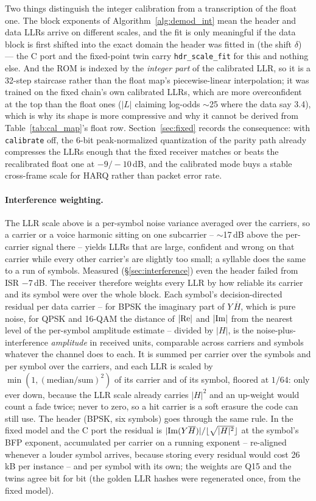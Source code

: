 Two things distinguish the integer calibration from a transcription of
the float one.  The block exponents of Algorithm~\ref{alg:demod_int}
mean the header and data LLRs arrive on different scales, and the fit
is only meaningful if the data block is first shifted into the exact
domain the header was fitted in (the shift $\delta$) --- the C port and the
fixed-point twin carry \texttt{hdr\_scale\_fit} for this and nothing
else.  And the ROM is indexed by the \emph{integer part} of the
calibrated LLR, so it is a 32-step staircase rather than the float
map's piecewise-linear interpolation; it was trained on the fixed
chain's own calibrated LLRs, which are more overconfident at the top
than the float ones ($|L|$ claiming log-odds $\sim$25 where the data
say 3.4), which is why its shape is more compressive and why it cannot
be derived from Table~\ref{tab:cal_map}'s float row.  Section~\ref{sec:fixed}
records the consequence: with \texttt{calibrate} off, the 6-bit
peak-normalized quantization of the parity path already compresses the
LLRs enough that the fixed receiver matches or beats the recalibrated
float one at $-9/-10$\,dB, and the calibrated mode buys a stable
cross-frame scale for HARQ rather than packet error rate.

\paragraph{Interference weighting.}
\label{sec:iweight}
The LLR scale above is a per-symbol noise variance averaged over the
carriers, so a carrier or a voice harmonic sitting on one subcarrier --
$\sim$17\,dB above the per-carrier signal there -- yields LLRs that are
large, confident and wrong on that carrier while every other carrier's
are slightly too small; a syllable does the same to a run of symbols.
Measured (\S\ref{sec:interference}) even the header failed from ISR
$-7$\,dB.  The receiver therefore weights every LLR by how reliable its
carrier and its symbol were over the whole block.  Each symbol's
decision-directed residual per data carrier -- for BPSK the imaginary
part of $Y\,\overline{H}$, which is pure noise, for QPSK and 16-QAM the
distance of $|{\rm Re}|$ and $|{\rm Im}|$ from the nearest level of the
per-symbol amplitude estimate -- divided by $|H|$, is the
noise-plus-interference \emph{amplitude} in received units, comparable
across carriers and symbols whatever the channel does to each.  It is
summed per carrier over the symbols and per symbol over the carriers,
and each LLR is scaled by $\min(1, (\mathrm{median}/\mathrm{sum})^2)$ of
its carrier and of its symbol, floored at $1/64$: only ever down,
because the LLR scale already carries $|H|^2$ and an up-weight would
count a fade twice; never to zero, so a hit carrier is a soft erasure
the code can still use.  The header (BPSK, six symbols) goes through the
same rule.  In the fixed model and the C port the residual is
$\lvert{\rm Im}(Y\overline{H})\rvert / \lfloor\sqrt{|H|^2}\rfloor$ at the
symbol's BFP exponent, accumulated per carrier on a running exponent --
re-aligned whenever a louder symbol arrives, because storing every
residual would cost 26\,kB per instance -- and per symbol with its own;
the weights are Q15 and the twins agree bit for bit (the golden LLR
hashes were regenerated once, from the fixed model).

